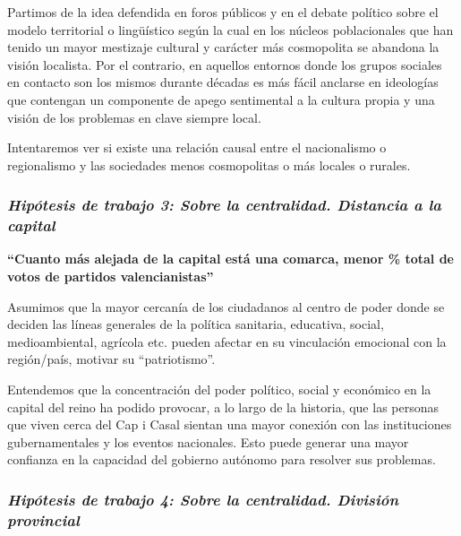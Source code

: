\documentclass[
]{article}
\begin{document}
Partimos de la idea defendida en foros públicos y en el debate político
sobre el modelo territorial o lingüístico según la cual en los núcleos
poblacionales que han tenido un mayor mestizaje cultural y carácter más
cosmopolita se abandona la visión localista. Por el contrario, en
aquellos entornos donde los grupos sociales en contacto son los mismos
durante décadas es más fácil anclarse en ideologías que contengan un
componente de apego sentimental a la cultura propia y una visión de los
problemas en clave siempre local.

Intentaremos ver si existe una relación causal entre el nacionalismo o
regionalismo y las sociedades menos cosmopolitas o más locales o
rurales.

\hypertarget{hipuxf3tesis-de-trabajo-3-sobre-la-centralidad.-distancia-a-la-capital}{%
\subsubsection{\texorpdfstring{\emph{Hipótesis de trabajo 3: Sobre la
centralidad. Distancia a la
capital}}{Hipótesis de trabajo 3: Sobre la centralidad. Distancia a la capital}}\label{hipuxf3tesis-de-trabajo-3-sobre-la-centralidad.-distancia-a-la-capital}}

\textbf{``Cuanto más alejada de la capital está una comarca, menor \%
total de votos de partidos valencianistas''}

Asumimos que la mayor cercanía de los ciudadanos al centro de poder
donde se deciden las líneas generales de la política sanitaria,
educativa, social, medioambiental, agrícola etc. pueden afectar en su
vinculación emocional con la región/país, motivar su ``patriotismo''.

Entendemos que la concentración del poder político, social y económico
en la capital del reino ha podido provocar, a lo largo de la historia,
que las personas que viven cerca del Cap i Casal sientan una mayor
conexión con las instituciones gubernamentales y los eventos nacionales.
Esto puede generar una mayor confianza en la capacidad del gobierno
autónomo para resolver sus problemas.

\hypertarget{hipuxf3tesis-de-trabajo-4-sobre-la-centralidad.-divisiuxf3n-provincial}{%
\subsubsection{\texorpdfstring{\emph{Hipótesis de trabajo 4: Sobre la
centralidad. División
provincial}}{Hipótesis de trabajo 4: Sobre la centralidad. División provincial}}\label{hipuxf3tesis-de-trabajo-4-sobre-la-centralidad.-divisiuxf3n-provincial}}
\end{document}
